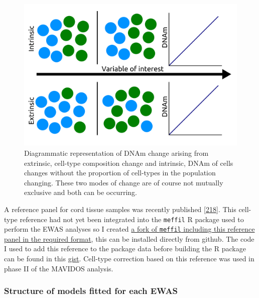\documentclass[
]{book}
\begin{document}
\begin{figure}

{\centering \includegraphics[width=0.8\linewidth]{figs/IntrinsicVsExtrinsicDNAmChangeGeneral} 

}

\caption{Diagrammatic representation of DNAm change arising from extrinsic, cell-type composition change and intrinsic, DNAm of cells changes without the proportion of cell-types in the population changing. These two modes of change are of course not mutually exclusive and both can be occurring.}\label{fig:IntrinsicVsExtrinsicDNAmChangeGeneral}
\end{figure}



A reference panel for cord tissue samples was recently published {[}\protect\hyperlink{ref-Lin2018}{218}{]}.
This cell-type reference had not yet been integrated into the \texttt{meffil} R package used to perform the EWAS analyses so I created \href{https://github.com/RichardJActon/meffil/blob/LinAndKarnaniCordTissueRef/data-raw/lin-karnani-reference.r}{a fork of \texttt{meffil} including this reference panel in the required format}, this can be installed directly from github.
The code I used to add this reference to the package data before building the R package can be found in this \href{https://gist.github.com/RichardJActon/703ae70438e865a37998cd608bd12cd3}{gist}.
Cell-type correction based on this reference was used in phase II of the MAVIDOS analysis.

\hypertarget{structure-of-models-fitted-for-each-ewas}{%
\subsubsection{Structure of models fitted for each EWAS}\label{structure-of-models-fitted-for-each-ewas}}
\end{document}
